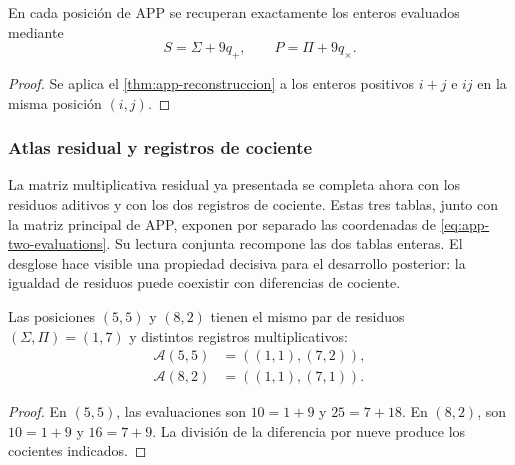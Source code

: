 \begin{bloqueindivisible}
\begin{corolario}
\label{cor:app-evaluaciones-restituidas}
En cada posición de APP se recuperan exactamente los enteros evaluados mediante
\begin{equation}
 S=\Sigma+9q_+,
 \qquad P=\Pi+9q_\times.
 \label{eq:app-s-p-lift}
\end{equation}
\end{corolario}

\begin{proof}
Se aplica el \cref{thm:app-reconstruccion} a los enteros positivos $i+j$ e $ij$ en la misma posición $(i,j)$.
\end{proof}
\end{bloqueindivisible}

\subsubsection{Atlas residual y registros de cociente}

La matriz multiplicativa residual ya presentada se completa ahora con los residuos aditivos y con los dos registros de cociente. Estas tres tablas, junto con la matriz principal de APP, exponen por separado las coordenadas de \eqref{eq:app-two-evaluations}. Su lectura conjunta recompone las dos tablas enteras. El desglose hace visible una propiedad decisiva para el desarrollo posterior: la igualdad de residuos puede coexistir con diferencias de cociente.





\begin{bloqueindivisible}
\begin{proposicion}
\label{prop:app-centro}
Las posiciones $(5,5)$ y $(8,2)$ tienen el mismo par de residuos $(\Sigma,\Pi)=(1,7)$ y distintos registros multiplicativos:
\begin{align}
 \mathcal A(5,5)&=((1,1),(7,2)),\\
 \mathcal A(8,2)&=((1,1),(7,1)).
\end{align}
\end{proposicion}

\begin{proof}
En $(5,5)$, las evaluaciones son $10=1+9$ y $25=7+18$. En $(8,2)$, son $10=1+9$ y $16=7+9$. La división de la diferencia por nueve produce los cocientes indicados.
\end{proof}
\end{bloqueindivisible}

